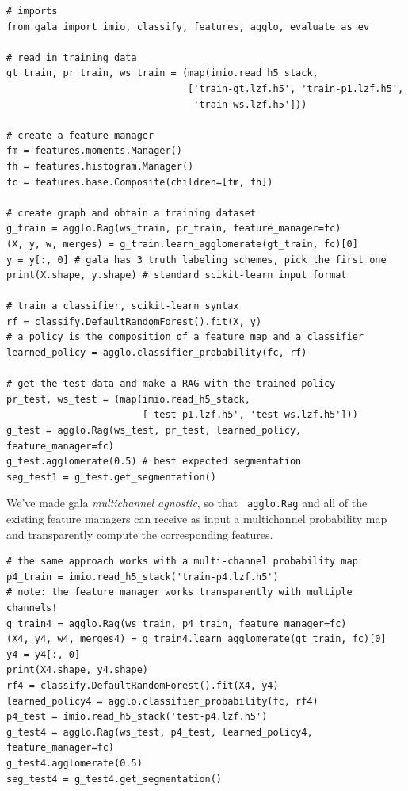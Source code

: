 \documentclass{frontiersSCNS} %
\begin{document}
{\small
\begin{verbatim}
# imports
from gala import imio, classify, features, agglo, evaluate as ev

# read in training data
gt_train, pr_train, ws_train = (map(imio.read_h5_stack,
                                ['train-gt.lzf.h5', 'train-p1.lzf.h5',
                                 'train-ws.lzf.h5']))

# create a feature manager
fm = features.moments.Manager()
fh = features.histogram.Manager()
fc = features.base.Composite(children=[fm, fh])

# create graph and obtain a training dataset
g_train = agglo.Rag(ws_train, pr_train, feature_manager=fc)
(X, y, w, merges) = g_train.learn_agglomerate(gt_train, fc)[0]
y = y[:, 0] # gala has 3 truth labeling schemes, pick the first one
print(X.shape, y.shape) # standard scikit-learn input format

# train a classifier, scikit-learn syntax
rf = classify.DefaultRandomForest().fit(X, y)
# a policy is the composition of a feature map and a classifier
learned_policy = agglo.classifier_probability(fc, rf)

# get the test data and make a RAG with the trained policy
pr_test, ws_test = (map(imio.read_h5_stack,
                        ['test-p1.lzf.h5', 'test-ws.lzf.h5']))
g_test = agglo.Rag(ws_test, pr_test, learned_policy, feature_manager=fc)
g_test.agglomerate(0.5) # best expected segmentation
seg_test1 = g_test.get_segmentation()
\end{verbatim}
}

We've made gala \emph{multichannel agnostic}, so that \texttt{ \small agglo.Rag} and all of the existing feature managers can receive as input a multichannel probability map and transparently compute the corresponding features.

{\small
\begin{verbatim}
# the same approach works with a multi-channel probability map
p4_train = imio.read_h5_stack('train-p4.lzf.h5')
# note: the feature manager works transparently with multiple channels!
g_train4 = agglo.Rag(ws_train, p4_train, feature_manager=fc)
(X4, y4, w4, merges4) = g_train4.learn_agglomerate(gt_train, fc)[0]
y4 = y4[:, 0]
print(X4.shape, y4.shape)
rf4 = classify.DefaultRandomForest().fit(X4, y4)
learned_policy4 = agglo.classifier_probability(fc, rf4)
p4_test = imio.read_h5_stack('test-p4.lzf.h5')
g_test4 = agglo.Rag(ws_test, p4_test, learned_policy4, feature_manager=fc)
g_test4.agglomerate(0.5)
seg_test4 = g_test4.get_segmentation()
\end{verbatim}
}
\end{document}
